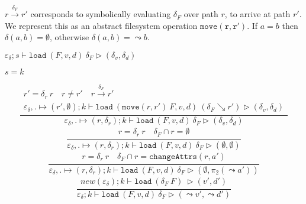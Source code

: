 \documentclass[10pt,twoside,a4paper]{article}
\theoremstyle{theorem}
\theoremstyle{lemma}
\theoremstyle{property}
\begin{document}
$r \xrightarrow{\delta_F} r'$ corresponds to symbolically evaluating $\delta_F$ over path $r$, to arrive at path $r'$. We represent this as an abstract filesystem operation $\mathtt{move(r,r')}$.
If $a = b$ then $\delta(a,b) = \emptyset$, otherwise $\delta(a,b) = \leadsto b$.


$\boxed{\varepsilon_\delta ; s \vdash \mathtt{load}~ (F,v,d)~ \delta_F \rhd (\delta_v,\delta_d)}$
	
$\boxed{s = k}$

\begin{displaymath}
	\frac{\begin{array}{c}
		r' = \delta_r ~ r \quad r \neq r' \quad r \xrightarrow{\delta_F} r'\\
		\varepsilon_\delta , . \mapsto (r',\emptyset) ; k \vdash \mathtt{load}~ (\mathtt{move} (r,r') ~ F,v,d)~ (\delta_F \searrow r') \rhd (\delta_v,\delta_d)
	\end{array}}
	{\varepsilon_\delta , . \mapsto (r,\delta_r) ; k \vdash \mathtt{load}~ (F,v,d)~ \delta_F \rhd (\delta_v,\delta_d)}
\end{displaymath}
\begin{displaymath}
	\frac{\begin{array}{c}
		r = \delta_r ~r \quad \delta_F \cap r = \emptyset
	\end{array}}
	{\varepsilon_\delta , . \mapsto (r,\delta_r) ; k \vdash \mathtt{load}~ (F,v,d)~ \delta_F \rhd (\emptyset,\emptyset)}
\end{displaymath}
\begin{displaymath}
	\frac{\begin{array}{c}
	r = \delta_r ~r \quad \delta_F \cap r = \mathtt{changeAttrs}(r,a')
	\end{array}}
	{\varepsilon_\delta , . \mapsto (r,\delta_r) ; k \vdash \mathtt{load}~ (F,v,d)~ \delta_F \rhd (\emptyset,\pi_2(\leadsto a'))}
\end{displaymath}
\begin{displaymath}
	\frac{\begin{array}{c}
		new(\varepsilon_\delta) ; k \vdash \mathtt{load}~ (\delta_F~ F)~  \rhd (v',d')
	\end{array}}
	{\varepsilon_\delta ; k \vdash \mathtt{load}~ (F,v,d)~ \delta_F \rhd (\leadsto v',\leadsto d')}
\end{displaymath}
\end{document}
